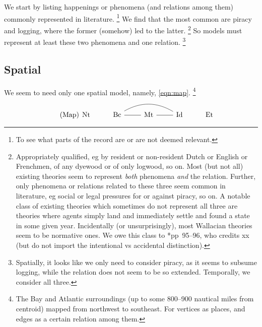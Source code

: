 	We start by listing happenings or phenomena (and relations among them) commonly represented in literature.%
	\footnote{To see what parts of the record are or are not deemed relevant.}
	We find that the most common are piracy and logging, where the former (somehow) led to the latter.%
	\footnote{Appropriately qualified, eg  by resident or non-resident Dutch or English or Frenchmen,  of any dyewood or of only logwood, so on. Most (but not all) existing theories seem to represent \emph{both} phenomena \emph{and} the relation. Further, only phenomena or relations related to these three seem common in literature, eg social or legal pressures for or against piracy, so on. A notable class of existing theories which sometimes do not represent all three are  theories where agents simply land and immediately settle and found a state in some given year. Incidentally (or unsurprisingly), most Wallacian theories seem to be normative ones. We owe this class to \cite{cam11}*{pp~95--96}, who credits xx (but do not import the intentional vs accidental distinction).}
	So models must represent at least these two phenomena and one relation.%
	\footnote{Spatially, it looks like we only need to consider piracy, as it seems to subsume logging, while the relation does not seem to be so extended. Temporally, we consider all three.}
	\subsection{Spatial}
	\label{ss:spatial}
		We seem to need only one spatial model, namely, \ref{eqn:map}.%
		\footnote{The Bay and Atlantic surroundings (up to some 800--900 nautical miles from centroid) mapped from northwest to southeast. For vertices as places, and edges as a certain relation among them. }
		\begin{equation}
		\tag{Map}
		\label{eqn:map}
		\begin{tikzcd}[arrows=dash]
		\nt &\bc \rar \ar[rr,bend left] &\mt \rar &\id &\et
		\end{tikzcd}
		\end{equation}
	
